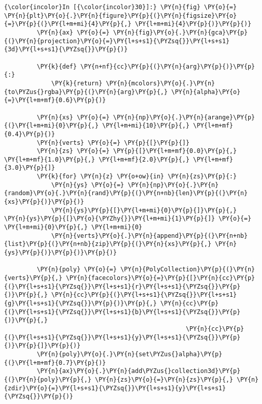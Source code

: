     \begin{Verbatim}[commandchars=\\\{\},frame=single,framerule=0.3mm,rulecolor=\color{cellframecolor}]
{\color{incolor}In [{\color{incolor}30}]:} \PY{n}{fig} \PY{o}{=} \PY{n}{plt}\PY{o}{.}\PY{n}{figure}\PY{p}{(}\PY{n}{figsize}\PY{o}{=}\PY{p}{(}\PY{l+m+mi}{4}\PY{p}{,} \PY{l+m+mi}{4}\PY{p}{)}\PY{p}{)}
         \PY{n}{ax} \PY{o}{=} \PY{n}{fig}\PY{o}{.}\PY{n}{gca}\PY{p}{(}\PY{n}{projection}\PY{o}{=}\PY{l+s+s1}{\PYZsq{}}\PY{l+s+s1}{3d}\PY{l+s+s1}{\PYZsq{}}\PY{p}{)}
         
         \PY{k}{def} \PY{n+nf}{cc}\PY{p}{(}\PY{n}{arg}\PY{p}{)}\PY{p}{:}
             \PY{k}{return} \PY{n}{mcolors}\PY{o}{.}\PY{n}{to\PYZus{}rgba}\PY{p}{(}\PY{n}{arg}\PY{p}{,} \PY{n}{alpha}\PY{o}{=}\PY{l+m+mf}{0.6}\PY{p}{)}
         
         \PY{n}{xs} \PY{o}{=} \PY{n}{np}\PY{o}{.}\PY{n}{arange}\PY{p}{(}\PY{l+m+mi}{0}\PY{p}{,} \PY{l+m+mi}{10}\PY{p}{,} \PY{l+m+mf}{0.4}\PY{p}{)}
         \PY{n}{verts} \PY{o}{=} \PY{p}{[}\PY{p}{]}
         \PY{n}{zs} \PY{o}{=} \PY{p}{[}\PY{l+m+mf}{0.0}\PY{p}{,} \PY{l+m+mf}{1.0}\PY{p}{,} \PY{l+m+mf}{2.0}\PY{p}{,} \PY{l+m+mf}{3.0}\PY{p}{]}
         \PY{k}{for} \PY{n}{z} \PY{o+ow}{in} \PY{n}{zs}\PY{p}{:}
             \PY{n}{ys} \PY{o}{=} \PY{n}{np}\PY{o}{.}\PY{n}{random}\PY{o}{.}\PY{n}{rand}\PY{p}{(}\PY{n+nb}{len}\PY{p}{(}\PY{n}{xs}\PY{p}{)}\PY{p}{)}
             \PY{n}{ys}\PY{p}{[}\PY{l+m+mi}{0}\PY{p}{]}\PY{p}{,} \PY{n}{ys}\PY{p}{[}\PY{o}{\PYZhy{}}\PY{l+m+mi}{1}\PY{p}{]} \PY{o}{=} \PY{l+m+mi}{0}\PY{p}{,} \PY{l+m+mi}{0}
             \PY{n}{verts}\PY{o}{.}\PY{n}{append}\PY{p}{(}\PY{n+nb}{list}\PY{p}{(}\PY{n+nb}{zip}\PY{p}{(}\PY{n}{xs}\PY{p}{,} \PY{n}{ys}\PY{p}{)}\PY{p}{)}\PY{p}{)}
         
         \PY{n}{poly} \PY{o}{=} \PY{n}{PolyCollection}\PY{p}{(}\PY{n}{verts}\PY{p}{,} \PY{n}{facecolors}\PY{o}{=}\PY{p}{[}\PY{n}{cc}\PY{p}{(}\PY{l+s+s1}{\PYZsq{}}\PY{l+s+s1}{r}\PY{l+s+s1}{\PYZsq{}}\PY{p}{)}\PY{p}{,} \PY{n}{cc}\PY{p}{(}\PY{l+s+s1}{\PYZsq{}}\PY{l+s+s1}{g}\PY{l+s+s1}{\PYZsq{}}\PY{p}{)}\PY{p}{,} \PY{n}{cc}\PY{p}{(}\PY{l+s+s1}{\PYZsq{}}\PY{l+s+s1}{b}\PY{l+s+s1}{\PYZsq{}}\PY{p}{)}\PY{p}{,}
                                                  \PY{n}{cc}\PY{p}{(}\PY{l+s+s1}{\PYZsq{}}\PY{l+s+s1}{y}\PY{l+s+s1}{\PYZsq{}}\PY{p}{)}\PY{p}{]}\PY{p}{)}
         \PY{n}{poly}\PY{o}{.}\PY{n}{set\PYZus{}alpha}\PY{p}{(}\PY{l+m+mf}{0.7}\PY{p}{)}
         \PY{n}{ax}\PY{o}{.}\PY{n}{add\PYZus{}collection3d}\PY{p}{(}\PY{n}{poly}\PY{p}{,} \PY{n}{zs}\PY{o}{=}\PY{n}{zs}\PY{p}{,} \PY{n}{zdir}\PY{o}{=}\PY{l+s+s1}{\PYZsq{}}\PY{l+s+s1}{y}\PY{l+s+s1}{\PYZsq{}}\PY{p}{)}
         

\end{Verbatim}
